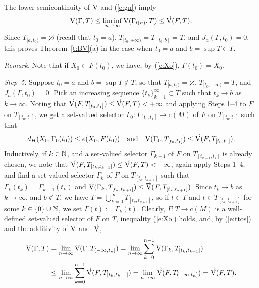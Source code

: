 \documentclass[preprint,12pt]{elsarticle}
\newcommand{\eq}[1]{\mbox{\rm(\ref{#1})}}
\newcommand{\es}{\varnothing}
\newcommand{\nV}{\mbox{\rm V}}
\newcommand{\riV}{{\scriptstyle\overrightarrow{\mbox{\rm V}}}}
\begin{document}
\begin{pfBV}
The lower semicontinuity of $\nV$ and \eq{e:gn} imply
  \begin{equation*}
\nV(\Gamma,T)\le\liminf_{n\to\infty}\nV(\Gamma_{l(n)},T)\le\riV(F,T).
  \end{equation*}
Since $T_{[a,t_0)}\!=\!\es$ (recall that $t_0\!=\!a$),
$T_{[t_0,+\infty)}\!=\!T_{[t_0,b]}\!=\!T$, and \mbox{$J_a(\Gamma,t_0)\!=\!0$},
this proves Theorem~\ref{t:BV}(a) in the case when $t_0=a$ and $b=\sup T\in T$.

\smallbreak
{\it Remark}. Note that if $X_0\subset F(t_0)$, we have, by \eq{e:Xo},
$\Gamma(t_0)=X_0$.

\smallbreak
{\it Step~5}. Suppose $t_0=a$ and $b=\sup T\notin T$, so that
$T_{[a,t_0)}\!=\!\es$, $T_{[t_0,+\infty)}\!=\!T$, and $J_a(\Gamma,t_0)=0$.
Pick an increasing sequence $\{t_k\}_{k=1}^\infty\subset T$ such that
$t_k\to b$ as $k\to\infty$. Noting that $\riV(F,T_{[t_0,t_1]})\le\riV(F,T)<+\infty$
and applying Steps 1--4 to $F$ on $T_{[t_0,t_1]}$, we get a set-valued selector
$\Gamma_0:T_{[t_0,t_1]}\to\mbox{c}(M)$ of $F$ on $T_{[t_0,t_1]}$ such that
  \begin{equation*}
d_H(X_0,\Gamma_0(t_0))\le e(X_0,F(t_0))\quad\mbox{and}\quad
  \nV(\Gamma_0,T_{[t_0,t_1]})\le\riV(F,T_{[t_0,t_1]}).
  \end{equation*}
Inductively, if $k\in\mathbb{N}$, and a set-valued selector $\Gamma_{k-1}$ of $F$ on
$T_{[t_{k-1},t_k]}$ is already chosen, we note that
$\riV(F,T_{[t_k,t_{k+1}]})\le\riV(F,T)<+\infty$, again apply Steps 1--4, and find
a set-valued selector $\Gamma_k$ of $F$ on $T_{[t_k,t_{k+1}]}$ such that
$\Gamma_k(t_k)=\Gamma_{k-1}(t_k)$ and
$\nV(\Gamma_k,T_{[t_k,t_{k+1}]})\le\riV(F,T_{[t_k,t_{k+1}]})$.
Since $t_k\to b$ as $k\to\infty$, and $b\notin T$, we have
$T=\bigcup_{k=0}^\infty T_{[t_k,t_{k+1}]}$, so if $t\in T$ and $t\in T_{[t_k,t_{k+1}]}$
for some $k\in\{0\}\cup\mathbb{N}$, we set $\Gamma(t):=\Gamma_k(t)$. Clearly,
$\Gamma:T\to\mbox{c}(M)$ is a well-defined set-valued selector of $F$ on $T$,
inequality \eq{e:Xo} holds, and, by \eq{e:ttos} and the additivity of $\nV$ and~$\riV$,
  \begin{align*}
\nV(\Gamma,T)&=\lim_{n\to\infty}\nV(\Gamma,T_{(-\infty,t_n]})
  =\lim_{n\to\infty}\sum_{k=0}^{n-1}\nV(\Gamma_k,T_{[t_k,t_{k+1}]})\\
&\le\lim_{n\to\infty}\sum_{k=0}^{n-1}\riV(F,T_{[t_k,t_{k+1}]})
  =\lim_{n\to\infty}\riV(F,T_{(-\infty,t_n]})=\riV(F,T).
  \end{align*}


\end{pfBV}
\end{document}
